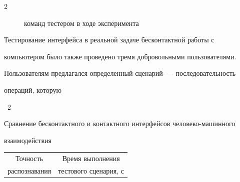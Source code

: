 \begin{multicols}{2}
\begin{figure}[b]
{команд тестером в ходе эксперимента}


\end{figure}


    


    Тестирование интерфейса в реальной задаче бесконтактной работы с 


компьютером было также проведено тремя добровольными пользователями. 


Пользователям предлагался определенный сценарий~--- последовательность 


операций, которую\linebreak\vspace*{-12pt}





\pagebreak





\noindent




{{\tablename~2}\ \ \small{Сравнение бесконтактного и контактного интерфейсов человеко-машинного 


взаимодействия}}







\vspace*{4pt}







    


{\small


\begin{center}






\begin{tabular}{|c|c|c|}


\hline


Точность&


\multicolumn{2}{c|}{Время выполнения}\\


распознавания &\multicolumn{2}{c|}{тестового сценария,  с}\\



\end{tabular}
\end{center}}
\end{multicols}
